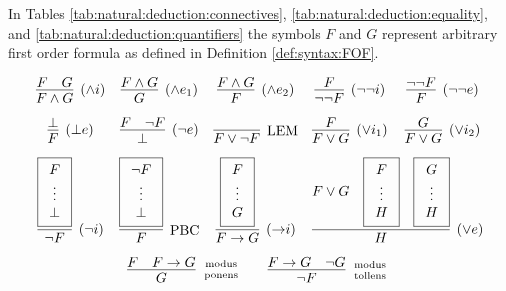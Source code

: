 
In Tables \ref{tab:natural:deduction:connectives}, \ref{tab:natural:deduction:equality}, and \ref{tab:natural:deduction:quantifiers} 
the symbols $F$ and $G$ represent arbitrary first order formula as defined in Definition \vref{def:syntax:FOF}.  

\begin{table}[hbt]
\begin{gather*}
\begin{array}{ccccc}
\infer[(\land i)]{F\land G}{F & G} 
&
\infer[(\land e_1)]{G}{F \land G} 
&
\infer[(\land e_2)]{F}{F \land G}
&
\infer[(\lnot\lnot i)]{\lnot\lnot F}{F} 
&
\infer[(\lnot\lnot e)]{F}{\lnot\lnot F}
\\[0.7em]
\infer[(\bot e)]{F}{\bot}
&
\infer[(\lnot e)]{\bot}{F & \lnot F}
&
\infer[\text{LEM}]{F\lor\lnot F}{}
&
\infer[(\lor i_1)]{F\lor G}{F}
&
\infer[(\lor i_2)]{F\lor G}{G}
\\[0.7em]
\infer[(\lnot i)]{\lnot F}{
	\boxed{\begin{array}{c}F\\\vdots\\\bot\end{array}}}
&
\infer[\text{PBC}]{F}{
	\boxed{\begin{array}{c}\lnot F\\\vdots\\\bot\end{array}}}
&
\infer[({\limp} i)]{F\limp G}{
	\boxed{\begin{array}{c}F\\\vdots\\G\end{array}
}}
&
\multicolumn{2}{l}{
	\infer[(\lor e)]{H}{
		F\lor G &
		\boxed{\begin{array}{c}F\\\vdots\\H\end{array}} &
		\boxed{\begin{array}{c}G\\\vdots\\H\end{array}}
	}	
}
\\[0.7em]
&
\multicolumn{3}{r}{
\infer[\text{modus}\atop\text{ponens}]{G}{F & F\limp G}
\qquad
\infer[\text{modus}\atop\text{tollens}]{\lnot F}{F\limp G & \lnot G}
}
&
\end{array}
\end{gather*}
\caption{Natural Deduction Rules for Connectives}
\label{tab:natural:deduction:connectives}
\end{table}
